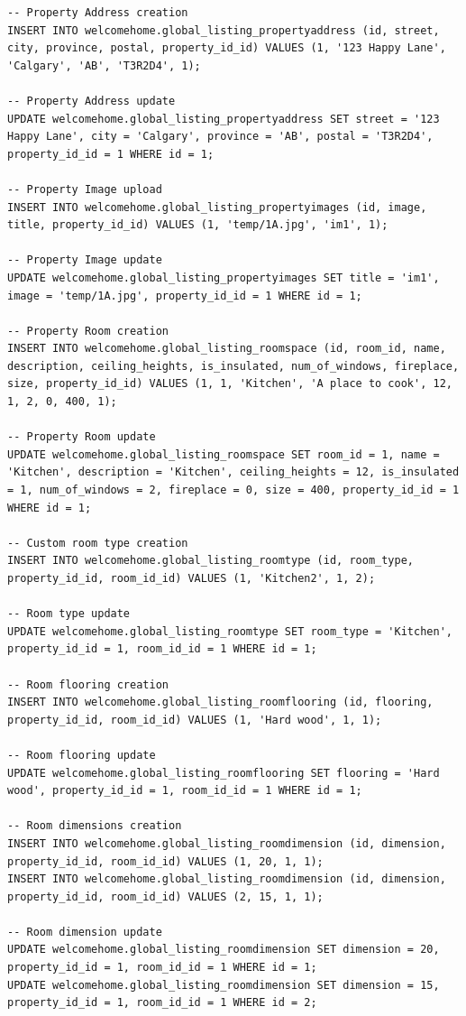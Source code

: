 \documentclass[12pt,a4paper]{report}
\begin{document}
\begin{itemize}
\begin{center}
\begin{lstlisting}
-- Property Address creation
INSERT INTO welcomehome.global_listing_propertyaddress (id, street, city, province, postal, property_id_id) VALUES (1, '123 Happy Lane', 'Calgary', 'AB', 'T3R2D4', 1);

-- Property Address update
UPDATE welcomehome.global_listing_propertyaddress SET street = '123 Happy Lane', city = 'Calgary', province = 'AB', postal = 'T3R2D4', property_id_id = 1 WHERE id = 1;

-- Property Image upload
INSERT INTO welcomehome.global_listing_propertyimages (id, image, title, property_id_id) VALUES (1, 'temp/1A.jpg', 'im1', 1);

-- Property Image update
UPDATE welcomehome.global_listing_propertyimages SET title = 'im1', image = 'temp/1A.jpg', property_id_id = 1 WHERE id = 1;

-- Property Room creation
INSERT INTO welcomehome.global_listing_roomspace (id, room_id, name, description, ceiling_heights, is_insulated, num_of_windows, fireplace, size, property_id_id) VALUES (1, 1, 'Kitchen', 'A place to cook', 12, 1, 2, 0, 400, 1);

-- Property Room update
UPDATE welcomehome.global_listing_roomspace SET room_id = 1, name = 'Kitchen', description = 'Kitchen', ceiling_heights = 12, is_insulated = 1, num_of_windows = 2, fireplace = 0, size = 400, property_id_id = 1 WHERE id = 1;

-- Custom room type creation
INSERT INTO welcomehome.global_listing_roomtype (id, room_type, property_id_id, room_id_id) VALUES (1, 'Kitchen2', 1, 2);

-- Room type update
UPDATE welcomehome.global_listing_roomtype SET room_type = 'Kitchen', property_id_id = 1, room_id_id = 1 WHERE id = 1;

-- Room flooring creation
INSERT INTO welcomehome.global_listing_roomflooring (id, flooring, property_id_id, room_id_id) VALUES (1, 'Hard wood', 1, 1);

-- Room flooring update
UPDATE welcomehome.global_listing_roomflooring SET flooring = 'Hard wood', property_id_id = 1, room_id_id = 1 WHERE id = 1;

-- Room dimensions creation
INSERT INTO welcomehome.global_listing_roomdimension (id, dimension, property_id_id, room_id_id) VALUES (1, 20, 1, 1);
INSERT INTO welcomehome.global_listing_roomdimension (id, dimension, property_id_id, room_id_id) VALUES (2, 15, 1, 1);

-- Room dimension update
UPDATE welcomehome.global_listing_roomdimension SET dimension = 20, property_id_id = 1, room_id_id = 1 WHERE id = 1;
UPDATE welcomehome.global_listing_roomdimension SET dimension = 15, property_id_id = 1, room_id_id = 1 WHERE id = 2;
\end{lstlisting}
\end{center}
\end{itemize}
\end{document}
